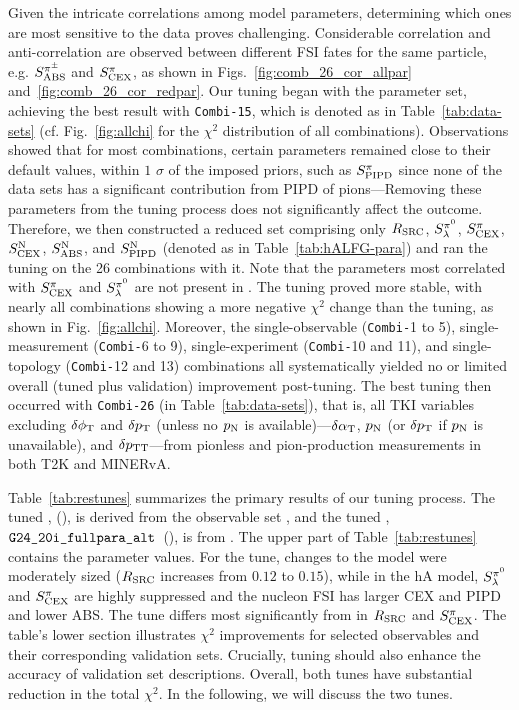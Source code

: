 Given the intricate correlations among model parameters, determining which ones are most sensitive to the data proves challenging. Considerable correlation and anti-correlation are observed between different FSI fates for the same particle, e.g. $S_\textrm{ABS}^{\pi^{\pm}}$ and $S_\textrm{CEX}^{\pi}$, as shown in Figs.~\ref{fig:comb_26_cor_allpar} and~\ref{fig:comb_26_cor_redpar}. 
Our tuning began with the \allpar parameter set, achieving the best result with \texttt{Combi-15}, which is denoted as \cbAllPar in Table~\ref{tab:data-sets} (cf. Fig.~\ref{fig:allchi} for the $\chi^2$ distribution of all combinations).
Observations showed that for most combinations, certain parameters remained close to their default values, within $1$ $\sigma$ of the imposed priors, such as $S_\textrm{PIPD}^{\pi}$ since none of the data sets has a significant contribution from PIPD of pions---Removing these parameters from the tuning process does not significantly affect the outcome.
Therefore, we then constructed a reduced set comprising only $R_\textrm{SRC}$, $S_\lambda^{\pi^{0}}$, $S_\textrm{CEX}^{\pi}$, $S_\textrm{CEX}^\textrm{N}$, $S_\textrm{ABS}^\textrm{N}$, and $S_\textrm{PIPD}^\textrm{N}$ (denoted as \redpar in Table~\ref{tab:hALFG-para}) and ran the tuning on the 26 combinations with it. Note that the parameters most correlated with $S_\textrm{CEX}^{\pi}$ and $S_\lambda^{\pi^{0}}$ are not present in \redpar. The \redpar tuning proved more stable, with nearly all combinations showing a more negative $\chi^2$ change than the \allpar tuning, as shown in Fig.~\ref{fig:allchi}. Moreover, the single-observable (\texttt{Combi-}1 to 5), single-measurement (\texttt{Combi-}6 to 9), single-experiment (\texttt{Combi-}10 and 11), and single-topology (\texttt{Combi-}12 and 13) combinations all systematically yielded no or limited overall (tuned plus validation) improvement post-tuning. The best tuning then occurred with \texttt{Combi-26} (\cbRedPar in Table~\ref{tab:data-sets}), that is, all TKI variables excluding $\delta\phi_\textrm{T}$ and $\delta p_\textrm{T}$ (unless no $p_\textrm{N}$ is available)---$\delta\alpha_\textrm{T}$, $p_\textrm{N}$ (or $\delta p_\textrm{T}$ if $p_\textrm{N}$ is unavailable), and $\delta p_\textrm{TT}$---from pionless and pion-production measurements in both T2K and MINERvA. 

Table~\ref{tab:restunes} summarizes the primary results of our tuning process. The tuned \redpar, \restunefull (\gC), is derived from the observable set \cbRedPar, and the tuned \allpar, $\texttt{G24\_20i\_fullpara\_alt}$~(\gT), is from \cbAllPar. The upper part of Table~\ref{tab:restunes} contains the parameter values. For the  \gC tune, changes to the \sfcfg model were moderately sized ($R_\textrm{SRC}$ increases from $0.12$ to $0.15$), while in the hA model, $S_\lambda^{\pi^{0}}$ and $S_\textrm{CEX}^{\pi}$ are highly suppressed and the nucleon FSI has larger CEX and PIPD and lower ABS.  The tune \gT differs most significantly from \gC in $R_\textrm{SRC}$ and $S_\textrm{CEX}^{\pi}$. The table's lower section illustrates $\chi^2$ improvements for selected observables and their corresponding validation sets. Crucially, tuning should also enhance the accuracy of validation set descriptions. Overall, both tunes have substantial reduction in the total $\chi^2$. In the following, we will discuss the two tunes.

